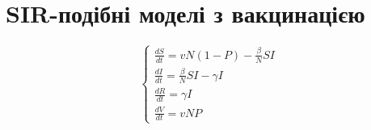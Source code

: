 \section{SIR-подібні моделі з вакцинацією}


\begin{equation*}
    \begin{cases}
        \frac{dS}{dt} = v N (1 - P) - \frac{\beta}{N}SI          \\
        \frac{dI}{dt} = \frac{\beta}{N}SI - \gamma I \\
        \frac{dR}{dt} = \gamma I \\
        \frac{dV}{dt} = v N P
    \end{cases}
\end{equation*}
